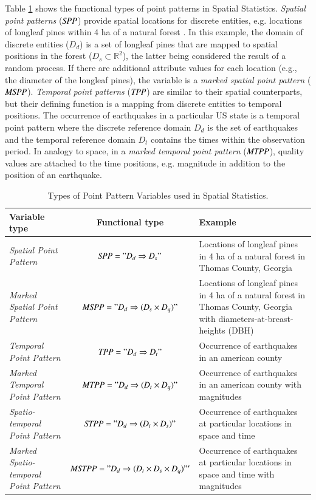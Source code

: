 \documentclass[final,authoryear,1p,times]{elsarticle}
\begin{document}
Table \ref{ppVarTable} shows the functional types of point patterns in Spatial Statistics. \textit{Spatial point patterns} ($\it{SPP}$) provide spatial locations for discrete entities, e.g. locations of longleaf pines within 4 ha of a natural forest \citep[p.204]{Cressie2011}. In this example, the domain of discrete entities ($D_d$) is a set of longleaf pines that are mapped to spatial positions in the forest ($D_s \subset \mathbb{R}^2$), the latter being considered the result of a random process. If there are additional attribute values for each location (e.g., the diameter of the longleaf pines), the variable is a \textit{marked spatial point pattern} ($\it{MSPP}$). \textit{Temporal point patterns} ($\it{TPP}$) are similar to their spatial counterparts, but their defining function is a mapping from discrete entities to temporal positions. The occurrence of earthquakes in a particular US state is a temporal point pattern where the discrete reference domain $D_d$ is the set of earthquakes and the temporal reference domain $D_t$ contains the times within the observation period. In analogy to space, in a \textit{marked temporal point pattern} ($\it{MTPP}$), quality values are attached to the time positions, e.g. magnitude in addition to the position of an earthquake. 

\begin{table}
\caption{Types of Point Pattern Variables used in Spatial Statistics.}
\label{ppVarTable}
\begin{tabular}[h]{|p{2.5cm}|c|p{4.6cm}|}
			\hline
			\textbf{Variable type} & \textbf{Functional type} &  \textbf{Example} \\
			\hline		
			 \textit{Spatial Point Pattern} & $ \it{SPP = "D_d \Rightarrow D_s"}$ &  Locations of longleaf pines in 4 ha of a natural forest in Thomas County, Georgia \\
			 \hline	
			 \textit{Marked Spatial Point Pattern} & $ \it{ MSPP= "D_d \Rightarrow (D_s \times D_q)"}$ &  Locations of longleaf pines in 4 ha of a natural forest in Thomas County, Georgia with diameters-at-breast-heights (DBH) \\
			 \hline	
			 \textit{Temporal Point Pattern} & $ \it{TPP= "D_d \Rightarrow D_t"}$ & Occurrence of earthquakes in an american county \\
			 \hline	
			 \textit{Marked Temporal Point Pattern} & $ \it{MTPP= "D_d \Rightarrow (D_t \times D_q)"}$ & Occurrence of earthquakes in an american county with magnitudes \\
			 \hline	
			 \textit{Spatio-temporal Point Pattern} & $ \it{STPP= "D_d \Rightarrow (D_t \times D_s)"}$ & Occurrence of earthquakes at particular locations in space and time \\
			 \hline	
			 \textit{Marked Spatio-temporal Point Pattern} & $ \it{MSTPP= "D_d \Rightarrow (D_t \times D_s \times D_q)"'}$ & Occurrence of earthquakes at particular locations in space and time with magnitudes \\
			 \hline
\end{tabular}
\end{table}
\end{document}
